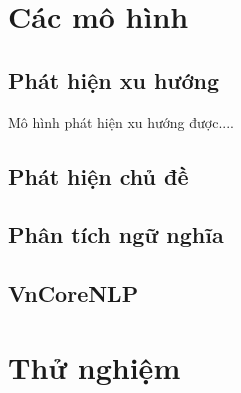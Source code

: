 \section{Các mô hình}
\label{sec:models}

\subsection{Phát hiện xu hướng}
Mô hình phát hiện xu hướng được....

\subsection{Phát hiện chủ đề}

\subsection{Phân tích ngữ nghĩa}

\subsection{VnCoreNLP}

\section{Thử nghiệm}
\label{sec:experiments}
